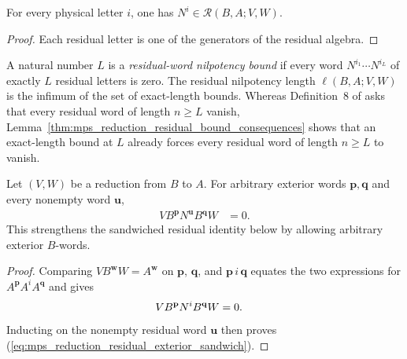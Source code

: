 \begin{lemma}
    \label{thm:mps_reduction_residual_mem_algebra}
    \leanok
    For every physical letter $i$, one has
    $N^i\in\mathcal R(B,A;V,W)$.
\end{lemma}

\begin{proof}
    \leanok
    Each residual letter is one of the generators of the residual algebra.
\end{proof}

\begin{definition}
    \label{def:mps_reduction_residual_nilpotency_length}
    \leanok
    A natural number $L$ is a \emph{residual-word nilpotency bound} if
    every word $N^{i_1}\cdots N^{i_L}$ of exactly $L$ residual letters is
    zero.  The residual nilpotency length $\ell(B,A;V,W)$ is the infimum
    of the set of exact-length bounds.  Whereas Definition~8 of
    \cite{Molnar2018SemiInjective} asks that every residual word of length
    $n\geq L$ vanish, Lemma~\ref{thm:mps_reduction_residual_bound_consequences}
    shows that an exact-length bound at $L$ already forces every residual word
    of length $n\geq L$ to vanish.
\end{definition}

\begin{lemma}
    \label{thm:mps_reduction_residual_exterior_sandwich}
    \leanok
    Let $(V,W)$ be a reduction from $B$ to $A$.  For arbitrary exterior words
    $\mathbf p,\mathbf q$ and every nonempty word $\mathbf u$,
    \begin{align}
        VB^{\mathbf p}N^{\mathbf u}B^{\mathbf q}W & =0.
        \label{eq:mps_reduction_residual_exterior_sandwich}
    \end{align}
    This strengthens the sandwiched residual identity below by allowing
    arbitrary exterior $B$-words.
\end{lemma}

\begin{proof}
    \leanok
    Comparing $VB^{\mathbf w}W=A^{\mathbf w}$ on $\mathbf p$, $\mathbf q$, and
    $\mathbf p\,i\,\mathbf q$ equates the two expressions for
    $A^{\mathbf p}A^iA^{\mathbf q}$ and gives
    \begin{align}
        VB^{\mathbf p}N^iB^{\mathbf q}W & =0.
        \notag
    \end{align}
    Inducting on the nonempty residual word $\mathbf u$ then proves
    (\ref{eq:mps_reduction_residual_exterior_sandwich}).
\end{proof}

